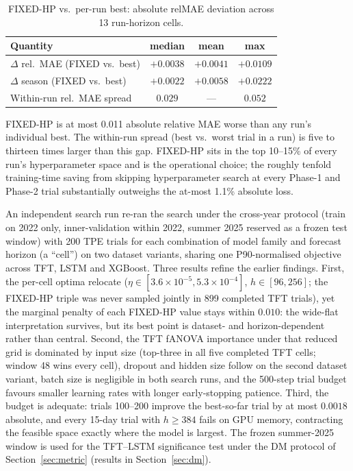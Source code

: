 \documentclass[twocolumn,twoside,a4paper,10pt]{IEEEtran}
\begin{document}
\begin{table}[!ht]
    \caption{FIXED-HP vs.\ per-run best: absolute relMAE deviation across 13 run-horizon cells.}
    \label{tab:hp_perrun}
    \begin{center}
    \footnotesize
    \begin{tabular}{lccc}
        \toprule
        Quantity & median & mean & max \\
        \midrule
        $\Delta$ rel.\ MAE  (FIXED vs.\ best) & $+0.0038$ & $+0.0041$ & $+0.0109$ \\
        $\Delta$ season    (FIXED vs.\ best)  & $+0.0022$ & $+0.0058$ & $+0.0222$ \\
        Within-run rel.\ MAE spread           & $0.029$   & ---       & $0.052$ \\
        \bottomrule
    \end{tabular}
    \end{center}
\end{table}

FIXED-HP is at most 0.011 absolute relative MAE worse than any run's individual best. The within-run spread (best vs.\ worst trial in a run) is five to thirteen times larger than this gap. FIXED-HP sits in the top 10--15\% of every run's hyperparameter space and is the operational choice; the roughly tenfold training-time saving from skipping hyperparameter search at every Phase-1 and Phase-2 trial substantially outweighs the at-most 1.1\% absolute loss.

An independent search run re-ran the search under the cross-year protocol (train on 2022 only, inner-validation within 2022, summer 2025 reserved as a frozen test window) with 200 TPE trials for each combination of model family and forecast horizon (a ``cell'') on two dataset variants, sharing one P90-normalised objective across TFT, LSTM and XGBoost. Three results refine the earlier findings. First, the per-cell optima relocate ($\eta \in [3.6\!\times\!10^{-5}, 5.3\!\times\!10^{-4}]$, $h \in [96, 256]$; the FIXED-HP triple was never sampled jointly in 899 completed TFT trials), yet the marginal penalty of each FIXED-HP value stays within $0.010$: the wide-flat interpretation survives, but its best point is dataset- and horizon-dependent rather than central. Second, the TFT fANOVA importance under that reduced grid is dominated by input size (top-three in all five completed TFT cells; window 48 wins every cell), dropout and hidden size follow on the second dataset variant, batch size is negligible in both search runs, and the 500-step trial budget favours smaller learning rates with longer early-stopping patience. Third, the budget is adequate: trials 100--200 improve the best-so-far trial by at most $0.0018$ absolute, and every 15-day trial with $h \geq 384$ fails on GPU memory, contracting the feasible space exactly where the model is largest. The frozen summer-2025 window is used for the TFT--LSTM significance test under the DM protocol of Section~\ref{sec:metric} (results in Section~\ref{sec:dm}).
\end{document}
